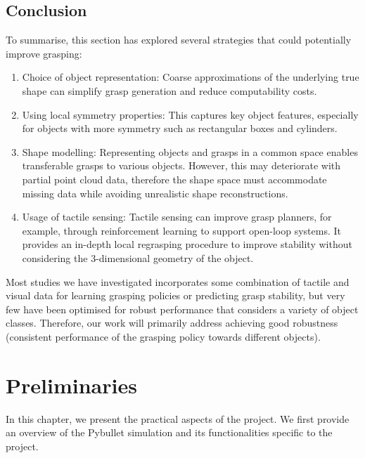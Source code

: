 \documentclass[11pt, a4paper]{report}
\begin{document}
\section{Conclusion}
\label{sec:2.4}
To summarise, this section has explored several strategies that could potentially improve grasping:
\begin{enumerate}
    \item Choice of object representation: Coarse approximations of the underlying true shape can simplify grasp generation and reduce computability costs.
    \item Using local symmetry properties: This captures key object features, especially for objects with more symmetry such as rectangular boxes and cylinders.
    \item Shape modelling: Representing objects and grasps in a common space enables transferable grasps to various objects. However, this may deteriorate with partial point cloud data, therefore the shape space must accommodate missing data while avoiding unrealistic shape reconstructions.
    \item Usage of tactile sensing: Tactile sensing can improve grasp planners, for example, through reinforcement learning to support open-loop systems. It provides an in-depth local regrasping procedure to improve stability without considering the 3-dimensional geometry of the object.
\end{enumerate}
Most studies we have investigated incorporates some combination of tactile and visual data for learning grasping policies or predicting grasp stability, but very few have been optimised for robust performance that considers a variety of object classes. Therefore, our work will primarily address achieving good robustness (consistent performance of the grasping policy towards different objects).



\chapter{Preliminaries}
\label{chap:3}
In this chapter, we present the practical aspects of the project. We first provide an overview of the Pybullet simulation and its functionalities specific to the project.
\end{document}
